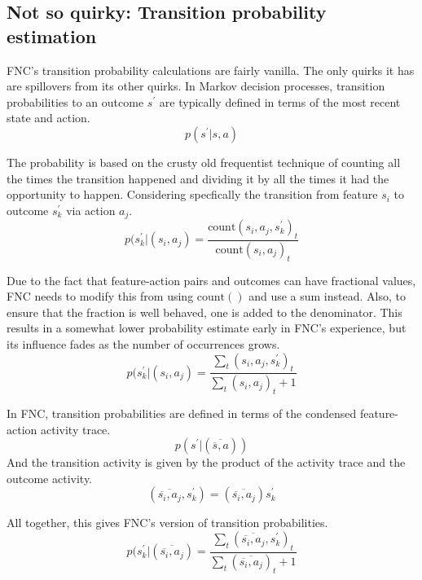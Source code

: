 \subsection*{Not so quirky: Transition probability estimation}
\label{algotransitions}

FNC's transition probability calculations are fairly vanilla. 
The only quirks it has are spillovers from its other quirks.
In Markov decision processes, transition probabilities 
to an outcome $s^\prime$ are typically defined
in terms of the most recent state and action.
\begin{equation}
p(s^\prime | s, a)
\end{equation}

The probability is based on the crusty old frequentist technique of
counting all the times the transition happened and dividing it by
all the times it had the opportunity to happen. Considering
specfically the transition from feature $s_i$ to outcome $s^\prime_k$
via action $a_j$.
\begin{equation}
p(s^\prime_k | (s_i, a_j) = \frac
{\mbox{count}(s_i, a_j, s^\prime_k)_t}
{\mbox{count}(s_i, a_j)_t}
\end{equation}

Due to the fact that feature-action pairs and outcomes can have fractional
values, FNC needs to modify this from using $\mbox{count}()$ and use
a sum instead. Also, to ensure that the fraction is well behaved, one is added
to the denominator. This results in a somewhat lower probability estimate
early in FNC's experience, but its influence fades as the number of occurrences
grows.
\begin{equation}
p(s^\prime_k | (s_i, a_j) = \frac
{\sum_t(s_i, a_j, s^\prime_k)_t}
{\sum_t(s_i, a_j)_t + 1}
\end{equation}

In FNC, transition probabilities are defined in terms of the condensed
feature-action activity trace.
\begin{equation}
p(s^\prime | (\overline{\overline{s}, a}))
\end{equation}
And the transition activity is given by the product of the activity trace
and the outcome activity.
\begin{equation}
(\overline{\overline{s_i}, a_j}, s^\prime_k) = 
(\overline{\overline{s_i}, a_j}) s^\prime_{k} 
\end{equation}

All together, this gives FNC's version of transition probabilities.
\begin{equation}
p(s^\prime_k | (\overline{\overline{s_i}, a_j}) = \frac
{\sum_t (\overline{\overline{s_i}, a_j}, s^\prime_k)_t}
{\sum_t (\overline{\overline{s_i}, a_j})_t + 1}
\end{equation}

